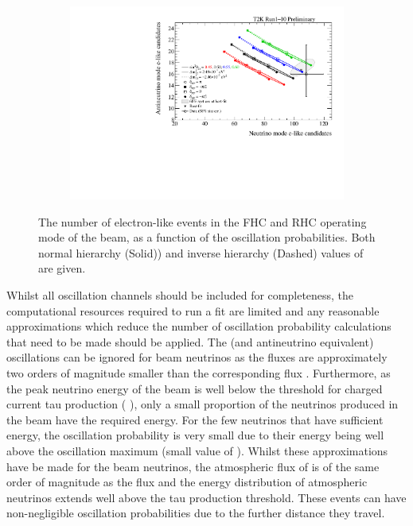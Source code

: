 \begin{figure}[h]
  \begin{subfigure}[t]{0.65\textwidth}
    \includegraphics[width=\textwidth, trim={0mm 0mm 0mm 0mm}, clip,page=1]{Figures/Oscillation/BiProbabilityPlot.pdf}
  \end{subfigure}
  \caption{The number of electron-like events in the FHC and RHC operating mode of the beam, as a function of the oscillation probabilities. Both normal hierarchy (Solid)) and inverse hierarchy (Dashed) values of  are given.}
  \label{fig:Oscillation_SK_BiProbabilityPlot}
\end{figure}

Whilst all oscillation channels should be included for completeness, the computational resources required to run a fit are limited and any reasonable approximations which reduce the number of oscillation probability calculations that need to be made should be applied. The  (and antineutrino equivalent) oscillations can be ignored for beam neutrinos as the  fluxes are approximately two orders of magnitude smaller than the corresponding \quickmath{\nu_{\mu}/\bar{\nu}_{\mu}} flux \cite{Abe2021-tr}. Furthermore, as the peak neutrino energy of the beam is well below the threshold for charged current tau production ( \cite{Li_2018}), only a small proportion of the neutrinos produced in the beam have the required energy. For the few neutrinos that have sufficient energy, the oscillation probability is very small due to their energy being well above the oscillation maximum (small value of ). Whilst these approximations have be made for the beam neutrinos, the atmospheric flux of  is of the same order of magnitude as the \quickmath{\nu_{\mu}} flux and the energy distribution of atmospheric neutrinos extends well above the tau production threshold. These events can have non-negligible oscillation probabilities due to the further distance they travel.
